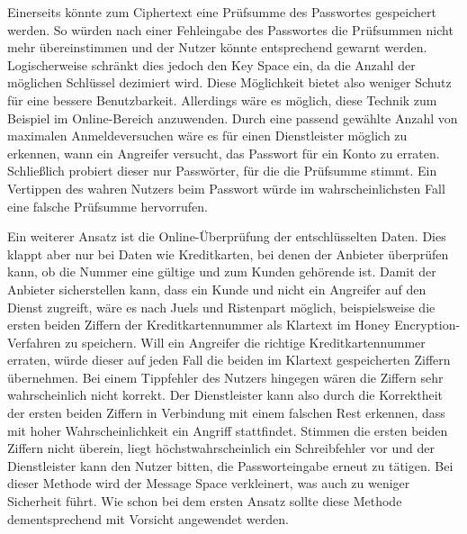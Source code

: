 Einerseits könnte zum Ciphertext eine Prüfsumme des Passwortes gespeichert werden. So würden nach einer Fehleingabe des Passwortes die Prüfsummen nicht mehr übereinstimmen und der Nutzer könnte entsprechend gewarnt werden. Logischerweise schränkt dies jedoch den Key Space ein, da die Anzahl der möglichen Schlüssel dezimiert wird. Diese Möglichkeit bietet also weniger Schutz für eine bessere Benutzbarkeit. Allerdings wäre es möglich, diese Technik zum Beispiel im Online-Bereich anzuwenden. Durch eine passend gewählte Anzahl von maximalen Anmeldeversuchen wäre es für einen Dienstleister möglich zu erkennen, wann ein Angreifer versucht, das Passwort für ein Konto zu erraten. Schließlich probiert dieser nur Passwörter, für die die Prüfsumme stimmt. Ein Vertippen des wahren Nutzers beim Passwort würde im wahrscheinlichsten Fall eine falsche Prüfsumme hervorrufen. 

Ein weiterer Ansatz ist die Online-Überprüfung der entschlüsselten Daten. Dies klappt aber nur bei Daten wie Kreditkarten, bei denen der Anbieter überprüfen kann, ob die Nummer eine gültige und zum Kunden gehörende ist. Damit der Anbieter sicherstellen kann, dass ein Kunde und nicht ein Angreifer auf den Dienst zugreift, wäre es nach Juels und Ristenpart möglich, beispielsweise die ersten beiden Ziffern der Kreditkartennummer als Klartext im Honey Encryption-Verfahren zu speichern. Will ein Angreifer die richtige Kreditkartennummer erraten, würde dieser auf jeden Fall die beiden im Klartext gespeicherten Ziffern übernehmen. Bei einem Tippfehler des Nutzers hingegen wären die Ziffern sehr wahrscheinlich nicht korrekt. Der Dienstleister kann also durch die Korrektheit der ersten beiden Ziffern in Verbindung mit einem falschen Rest erkennen, dass mit hoher Wahrscheinlichkeit ein Angriff stattfindet. Stimmen die ersten beiden Ziffern nicht überein, liegt höchstwahrscheinlich ein Schreibfehler vor und der Dienstleister kann den Nutzer bitten, die Passworteingabe erneut zu tätigen. Bei dieser Methode wird der Message Space verkleinert, was auch zu weniger Sicherheit führt. Wie schon bei dem ersten Ansatz sollte diese Methode dementsprechend mit Vorsicht angewendet werden. 

